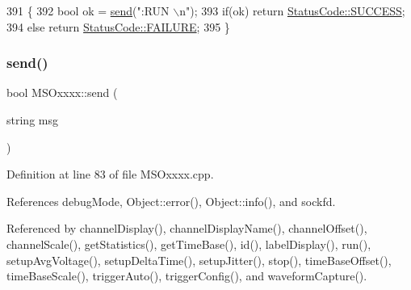\begin{DoxyCode}
391 \{
392     \textcolor{keywordtype}{bool} ok = \hyperlink{classMSOxxxx_ae77668a1ae4ccb74e0ed5f2485dfdebf}{send}(\textcolor{stringliteral}{":RUN \(\backslash\)n"});
393     \textcolor{keywordflow}{if}(ok)  \textcolor{keywordflow}{return} \hyperlink{classStatusCode_a6f565cbeadc76d14c72f047e5e85eb4badd0da38d3ba0d922efd1f4619bc37ad8}{StatusCode::SUCCESS};
394     \textcolor{keywordflow}{else}        \textcolor{keywordflow}{return} \hyperlink{classStatusCode_a6f565cbeadc76d14c72f047e5e85eb4ba3da73d4c469762eb9d3c960368252b26}{StatusCode::FAILURE};
395 \}
\end{DoxyCode}
\mbox{\label{classMSOxxxx_ae77668a1ae4ccb74e0ed5f2485dfdebf}} 
\subsubsection{\texorpdfstring{send()}{send()}}
{\footnotesize\ttfamily bool M\+S\+Oxxxx\+::send (\begin{DoxyParamCaption}\item[{string}]{msg }\end{DoxyParamCaption})\hspace{0.3cm}{\ttfamily [private]}}



Definition at line 83 of file M\+S\+Oxxxx.\+cpp.



References debug\+Mode, Object\+::error(), Object\+::info(), and sockfd.



Referenced by channel\+Display(), channel\+Display\+Name(), channel\+Offset(), channel\+Scale(), get\+Statistics(), get\+Time\+Base(), id(), label\+Display(), run(), setup\+Avg\+Voltage(), setup\+Delta\+Time(), setup\+Jitter(), stop(), time\+Base\+Offset(), time\+Base\+Scale(), trigger\+Auto(), trigger\+Config(), and waveform\+Capture().


